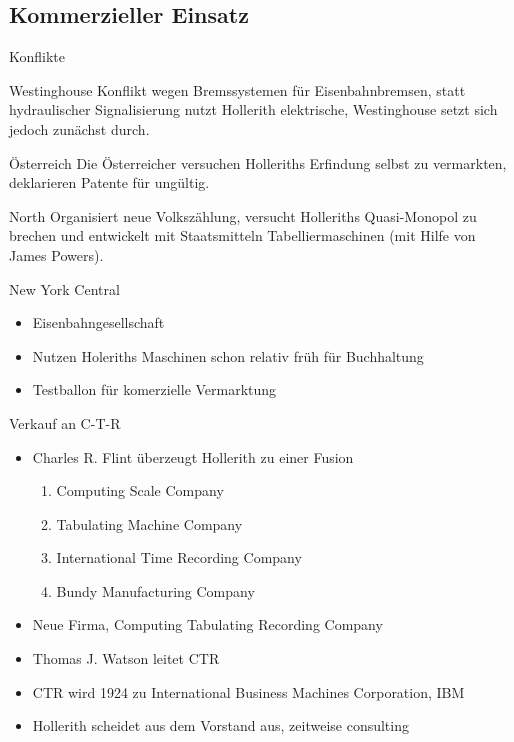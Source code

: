 \documentclass[EU2]{beamer}
\begin{document}
\subsection{Kommerzieller Einsatz}

\begin{frame}{Konflikte}
  \begin{block}{Westinghouse}
    Konflikt wegen Bremssystemen für Eisenbahnbremsen, statt hydraulischer
    Signalisierung nutzt Hollerith elektrische, Westinghouse setzt sich jedoch
    zunächst durch.
  \end{block}
  \begin{block}{Österreich}
    Die Österreicher versuchen Holleriths Erfindung selbst zu vermarkten,
    deklarieren Patente für ungültig.
  \end{block}
  \begin{block}{North}
    Organisiert neue Volkszählung, versucht Holleriths Quasi-Monopol zu brechen
    und entwickelt mit Staatsmitteln Tabelliermaschinen (mit Hilfe von James Powers).
  \end{block}
\end{frame}

\begin{frame}{New York Central}
  \begin{itemize}
    \item Eisenbahngesellschaft
    \item Nutzen Holeriths Maschinen schon relativ früh für Buchhaltung
    \item Testballon für komerzielle Vermarktung
  \end{itemize}
\end{frame}

\begin{frame}{Verkauf an C-T-R}
  \begin{itemize}
    \item Charles R. Flint überzeugt Hollerith zu einer Fusion
      \begin{enumerate}
        \item Computing Scale Company
        \item Tabulating Machine Company
	\item International Time Recording Company
	\item Bundy Manufacturing Company
      \end{enumerate}
    \item Neue Firma, Computing Tabulating Recording Company
    \item Thomas J. Watson leitet CTR
    \item CTR wird 1924 zu International Business Machines Corporation, IBM
    \item Hollerith scheidet aus dem Vorstand aus, zeitweise consulting
  \end{itemize}
\end{frame}
\end{document}
